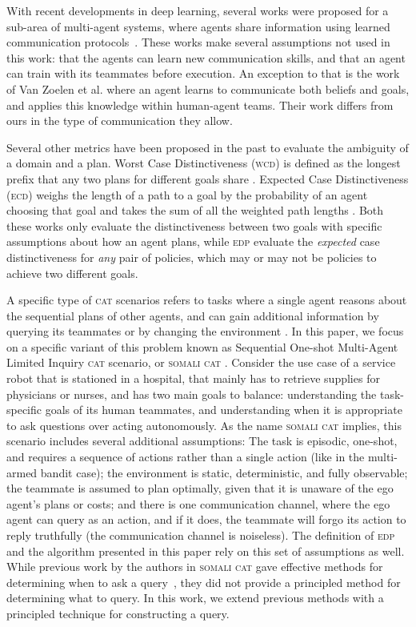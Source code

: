 \documentclass[letterpaper]{article}
\begin{document}
With recent developments in deep learning, several works were proposed for a sub-area of multi-agent systems, where agents share information using learned communication protocols~\cite{hernandez2019survey,mordatch2018emergence,foerster2016learning}. These works make several assumptions not used in this work: that the agents can learn new communication skills, and that an agent can train with its teammates before execution. An exception to that is the work of Van Zoelen et al.  where an agent learns to communicate both beliefs and goals, and applies this knowledge within human-agent teams. Their work differs from ours in the type of communication they allow.

Several other metrics have been proposed in the past to evaluate the ambiguity of a domain and a plan. Worst Case Distinctiveness (\textsc{wcd}) is defined as the longest prefix that any two plans for different goals share \cite{keren2014goal}. Expected Case Distinctiveness (\textsc{ecd}) weighs the length of a path to a goal by the probability of an agent choosing that goal and takes the sum of all the weighted path lengths \cite{wayllace2017new}. Both these works only evaluate the distinctiveness between two goals with specific assumptions about how an agent plans, while \textsc{edp} evaluate the \emph{expected} case distinctiveness for \emph{any} pair of policies, which may or may not be policies to achieve two different goals.

A specific type of \textsc{cat} scenarios refers to tasks where a single agent reasons about the sequential plans of other agents, and can gain additional information by querying its teammates or by changing the environment \cite{mirsky2018sequential,mirskypenny,shvo2020active}. In this paper, we focus on a specific variant of this problem known as Sequential One-shot Multi-Agent Limited Inquiry \textsc{cat} scenario, or \textsc{somali cat} \cite{mirskypenny}. Consider the use case of a service robot that is stationed in a hospital, that mainly has to retrieve supplies for physicians or nurses, and has two main goals to balance: understanding the task-specific goals of its human teammates, and understanding when it is appropriate to ask questions over acting autonomously. As the name \textsc{somali cat} implies, this scenario includes several additional assumptions: The task is episodic, one-shot, and requires a sequence of actions rather than a single action (like in the multi-armed bandit case); the environment is static, deterministic, and fully observable; the teammate is assumed to plan optimally, given that it is unaware of the ego agent's plans or costs; and there is one communication channel, where the ego agent can query as an action, and if it does, the teammate will forgo its action to reply truthfully (the communication channel is noiseless). The definition of \textsc{edp} and the algorithm presented in this paper rely on this set of assumptions as well. While previous work by the authors in \textsc{somali cat} gave effective methods for determining when to ask a query~\cite{mirskypenny}, they did not provide a principled method for determining what to query. In this work, we extend previous methods with a principled technique for constructing a query.
\end{document}
